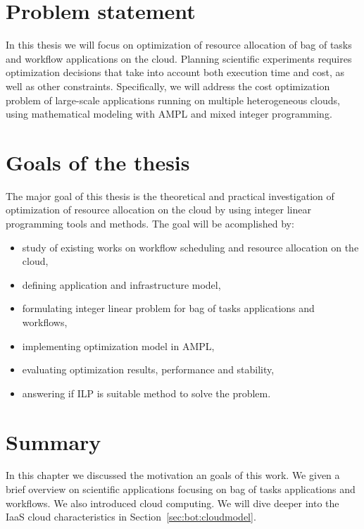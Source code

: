 \section{Problem statement}
\label{intro:statement}

In this thesis we will focus on optimization of resource allocation of bag of tasks and workflow applications on the cloud. Planning scientific experiments requires optimization decisions that take into account both execution time and cost, as well as other constraints. Specifically, we will address the cost optimization problem of large-scale applications running on multiple heterogeneous clouds, using mathematical modeling with AMPL and mixed integer programming.

\section{Goals of the thesis}
\label{intro:goals}

The major goal of this thesis is the theoretical and practical investigation of optimization of resource allocation on the cloud by using integer linear programming tools and methods. The goal will be acomplished by:

\begin{itemize}
  \item study of existing works on workflow scheduling and resource allocation on the cloud,
  \item defining application and infrastructure model,
  \item formulating integer linear problem for bag of tasks applications and workflows,
  \item implementing optimization model in AMPL,
  \item evaluating optimization results, performance and stability,
  \item answering if ILP is suitable method to solve the problem.
\end{itemize}

\section{Summary}

In this chapter we discussed the motivation an goals of this work. We given a brief overview on scientific applications focusing on bag of tasks applications and workflows. We also introduced cloud computing. We will dive deeper into the IaaS cloud characteristics in Section~\ref{sec:bot:cloudmodel}.
